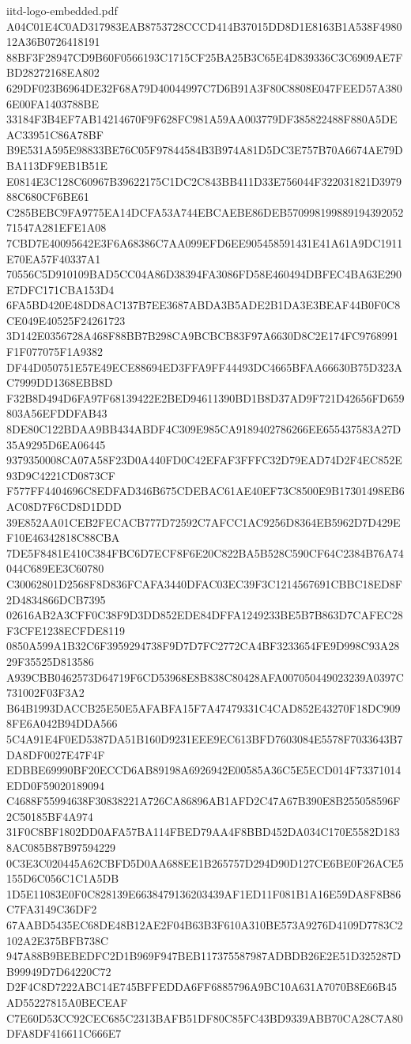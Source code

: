 \begin{filecontents*}[overwrite]{iitd-logo-embedded.pdf}
A04C01E4C0AD317983EAB8753728CCCD414B37015DD8D1E8163B1A538F498012A36B0726418191
88BF3F28947CD9B60F0566193C1715CF25BA25B3C65E4D839336C3C6909AE7FBD28272168EA802
629DF023B6964DE32F68A79D40044997C7D6B91A3F80C8808E047FEED57A3806E00FA1403788BE
33184F3B4EF7AB14214670F9F628FC981A59AA003779DF385822488F880A5DEAC33951C86A78BF
B9E531A595E98833BE76C05F97844584B3B974A81D5DC3E757B70A6674AE79DBA113DF9EB1B51E
E0814E3C128C60967B39622175C1DC2C843BB411D33E756044F322031821D397988C680CF6BE61
C285BEBC9FA9775EA14DCFA53A744EBCAEBE86DEB57099819988919439205271547A281EFE1A08
7CBD7E40095642E3F6A68386C7AA099EFD6EE905458591431E41A61A9DC1911E70EA57F40337A1
70556C5D910109BAD5CC04A86D38394FA3086FD58E460494DBFEC4BA63E290E7DFC171CBA153D4
6FA5BD420E48DD8AC137B7EE3687ABDA3B5ADE2B1DA3E3BEAF44B0F0C8CE049E40525F24261723
3D142E0356728A468F88BB7B298CA9BCBCB83F97A6630D8C2E174FC9768991F1F077075F1A9382
DF44D050751E57E49ECE88694ED3FFA9FF44493DC4665BFAA66630B75D323AC7999DD1368EBB8D
F32B8D494D6FA97F68139422E2BED94611390BD1B8D37AD9F721D42656FD659803A56EFDDFAB43
8DE80C122BDAA9BB434ABDF4C309E985CA9189402786266EE655437583A27D35A9295D6EA06445
9379350008CA07A58F23D0A440FD0C42EFAF3FFFC32D79EAD74D2F4EC852E93D9C4221CD0873CF
F577FF4404696C8EDFAD346B675CDEBAC61AE40EF73C8500E9B17301498EB6AC08D7F6CD8D1DDD
39E852AA01CEB2FECACB777D72592C7AFCC1AC9256D8364EB5962D7D429EF10E46342818C88CBA
7DE5F8481E410C384FBC6D7ECF8F6E20C822BA5B528C590CF64C2384B76A74044C689EE3C60780
C30062801D2568F8D836FCAFA3440DFAC03EC39F3C1214567691CBBC18ED8F2D4834866DCB7395
02616AB2A3CFF0C38F9D3DD852EDE84DFFA1249233BE5B7B863D7CAFEC28F3CFE1238ECFDE8119
0850A599A1B32C6F3959294738F9D7D7FC2772CA4BF3233654FE9D998C93A2829F35525D813586
A939CBB0462573D64719F6CD53968E8B838C80428AFA007050449023239A0397C731002F03F3A2
B64B1993DACCB25E50E5AFABFA15F7A47479331C4CAD852E43270F18DC9098FE6A042B94DDA566
5C4A91E4F0ED5387DA51B160D9231EEE9EC613BFD7603084E5578F7033643B7DA8DF0027E47F4F
EDBBE69990BF20ECCD6AB89198A6926942E00585A36C5E5ECD014F73371014EDD0F59020189094
C4688F55994638F30838221A726CA86896AB1AFD2C47A67B390E8B255058596F2C50185BF4A974
31F0C8BF1802DD0AFA57BA114FBED79AA4F8BBD452DA034C170E5582D1838AC085B87B97594229
0C3E3C020445A62CBFD5D0AA688EE1B265757D294D90D127CE6BE0F26ACE5155D6C056C1C1A5DB
1D5E11083E0F0C828139E6638479136203439AF1ED11F081B1A16E59DA8F8B86C7FA3149C36DF2
67AABD5435EC68DE48B12AE2F04B63B3F610A310BE573A9276D4109D7783C2102A2E375BFB738C
947A88B9BEBEDFC2D1B969F947BEB117375587987ADBDB26E2E51D325287DB99949D7D64220C72
D2F4C8D7222ABC14E745BFFEDDA6FF6885796A9BC10A631A7070B8E66B45AD55227815A0BECEAF
C7E60D53CC92CEC685C2313BAFB51DF80C85FC43BD9339ABB70CA28C7A80DFA8DF416611C666E7

\end{filecontents*}
